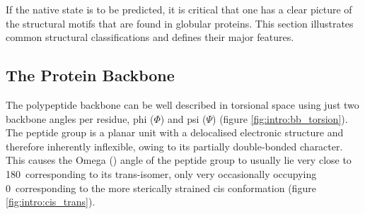 If the native state is to be predicted, it is critical that one has a clear picture of
the structural motifs that are found in globular proteins. This section illustrates common structural classifications and defines their major
features. 
\subsection{The Protein Backbone}
\label{section:intro:prot_backbone}

The polypeptide backbone can be well described in torsional space using just two backbone angles per residue, phi ($\Phi$) and psi ($\Psi$) (figure \ref{fig:intro:bb_torsion}).
The peptide group is a planar unit with a delocalised electronic structure and therefore inherently inflexible, owing to its partially double-bonded character. This  causes the Omega (\Omg) angle of the peptide group to usually lie very close to 180\degree\ corresponding to its trans-isomer, only very occasionally occupying 0\degree\ corresponding to the more sterically strained cis conformation (figure \ref{fig:intro:cis_trans}). 

